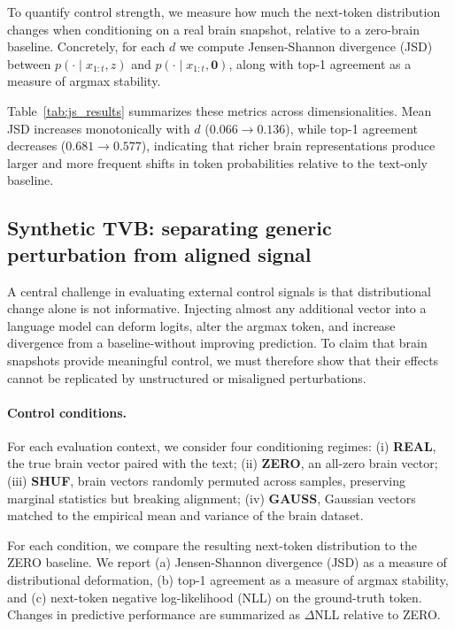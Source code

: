 \documentclass{article}
\theoremstyle{plain}
\theoremstyle{definition}
\theoremstyle{remark}
\begin{document}
To quantify control strength, we measure how much the next-token distribution changes when conditioning on a real brain snapshot, relative to a zero-brain baseline.
Concretely, for each $d$ we compute Jensen-Shannon divergence (JSD) between $p(\cdot \mid x_{1:t}, z)$ and $p(\cdot \mid x_{1:t}, \mathbf{0})$, along with top-1 agreement as a measure of argmax stability.

Table~\ref{tab:js_results} summarizes these metrics across dimensionalities. Mean JSD increases monotonically with $d$ ($0.066 \rightarrow 0.136$), while top-1 agreement decreases ($0.681 \rightarrow 0.577$), indicating that richer brain representations produce larger and more frequent shifts in token probabilities relative to the text-only baseline.




\subsection{Synthetic TVB: separating generic perturbation from aligned signal}
\label{sec:controls}

A central challenge in evaluating external control signals is that distributional change alone is not informative.
Injecting almost any additional vector into a language model can deform logits, alter the argmax token, and increase divergence from a baseline-without improving prediction.
To claim that brain snapshots provide meaningful control, we must therefore show that their effects cannot be replicated by unstructured or misaligned perturbations.



\paragraph{Control conditions.}
For each evaluation context, we consider four conditioning regimes:
(i) \textbf{REAL}, the true brain vector paired with the text;
(ii) \textbf{ZERO}, an all-zero brain vector;
(iii) \textbf{SHUF}, brain vectors randomly permuted across samples, preserving marginal statistics but breaking alignment;
(iv) \textbf{GAUSS}, Gaussian vectors matched to the empirical mean and variance of the brain dataset.

For each condition, we compare the resulting next-token distribution to the ZERO baseline.
We report (a) Jensen-Shannon divergence (JSD) as a measure of distributional deformation,
(b) top-1 agreement as a measure of argmax stability, and
(c) next-token negative log-likelihood (NLL) on the ground-truth token.
Changes in predictive performance are summarized as $\Delta$NLL relative to ZERO.
\end{document}
